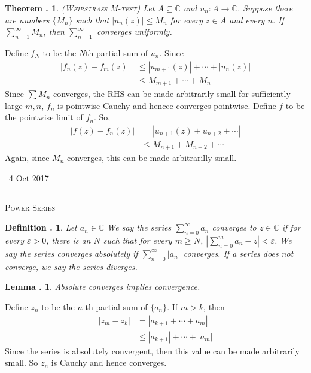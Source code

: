 \documentclass[twoside]{report}
\newcommand{\C}{\mathbb{C}}
\newcommand{\cleanbr}{\vspace{1em}\noindent}
\newcounter{Lecture}
\newcommand{\newLec}[1]{
  \stepcounter{Lecture}
  \noindent{\Large\bf Lecture \arabic{Lecture}} \, #1 \hfill  \rule[1ex]{2.5in}{.1pt} \vspace{1em}
}
\theoremstyle{myts}
\newcounter{c}[Lecture]
\newtheorem{dfn}[c]{Definition \arabic{Lecture}.}
\newtheorem{thm}[c]{Theorem \arabic{Lecture}.}
\newtheorem{lma}[c]{Lemma \arabic{Lecture}.}
\newcounter{ex}[Lecture]
\newenvironment{prf}{
  \noindent\begin{mdframed}[style=prf]}{\end{mdframed} \vspace{1em}
}
\begin{document}
\begin{thm}
  ({\scshape Weirstrass M-test}) Let \(A\subseteq\C\) and \( u_n : A \to \C \). Suppose there are numbers \( \{ M_n \} \) such that \(  | u_n(z) | \leq M_n \) for every \(z\in A\) and every $n$. If \( \sum_{n=1}^\infty M_n \), then \( \sum_{n=1}^\infty \) converges uniformly.
\end{thm}

\begin{prf}
  Define $f_N$ to be the $N$th partial sum of $u_n$. Since
  \begin{align*}
    | f_n(z) - f_m(z) | &\leq |u_{m+1}(z)| + \cdots + |u_{n}(z)| \\
      &\leq M_{m+1} + \cdots + M_{n}
  \end{align*}
  Since \(\sum M_n\) converges, the RHS can be made arbitrarily small for sufficiently large $m,n$, $f_n$ is pointwise Cauchy and hencce converges pointwise. Define $f$ to be the pointwise limit of $f_n$. So,
  \begin{align*}
    | f(z) - f_n(z) | &= | u_{n+1}(z) + u_{n+2} + \cdots | \\
      &\leq M_{n+1} + M_{n+2} + \cdots
  \end{align*}
  Again, since $M_n$ converges, this can be made arbitrarilly small. 
\end{prf}

\newLec{4 Oct 2017}

\cleanbr
{\scshape Power Series}

\begin{dfn}
  Let \(a_n \in \C \) We say the series \( \sum_{n=0}^\infty a_n \) \emph{converges} to \(z\in\C\) if for every \(\varepsilon > 0\), there is an $N$ such that for every \(m\geq N\), \( \left| \sum_{n=0}^m a_n - z \right| < \varepsilon \). We say the series \emph{converges absolutely} if \( \sum_{n=0}^\infty |a_n|\) converges. If a series does not converge, we say the series \emph{diverges}.
\end{dfn}

\begin{lma}
  Absolute converges implies convergence.
\end{lma}

\begin{prf}
  Define \(z_n\) to be the $n$-th partial sum of \(\{a_n\}\). If \(m>k\), then
  \begin{align*}
    | z_m - z_k | &= | a_{k+1} + \cdots + a_m | \\
      &\leq |a_{k+1}| + \cdots + |a_m|
  \end{align*}
  Since the series is absolutely convergent, then this value can be made arbitrarily small. So \(z_n\) is Cauchy and hence converges.
\end{prf}
\end{document}
